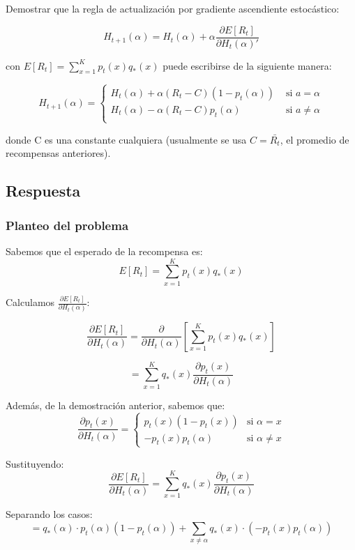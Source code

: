 \documentclass[12pt,a4paper]{article}
\begin{document}
Demostrar que la regla de actualización por gradiente ascendiente
estocástico:

$$ H_{t+1}(\alpha) = H_t(\alpha) + \alpha \frac{\partial E[R_t]}{\partial H_t(\alpha)'}$$

con $E[R_t] = \sum_{x=1}^{K} p_t(x)q_*(x)$ puede escribirse de la siguiente manera:

$$ H_{t+1}(\alpha) = 
\begin{cases} 
    H_t(\alpha) + \alpha (R_t - C)(1 - p_t(\alpha)) & \text{ si } a = \alpha \\
    H_t(\alpha) - \alpha (R_t - C)p_t(\alpha) & \text{ si } a \neq \alpha \\
\end{cases} $$

donde C es una constante cualquiera (usualmente se usa $C = \bar{R_t}$,
el promedio de recompensas anteriores).

\subsection{Respuesta}

\subsubsection{Planteo del problema}

Sabemos que el esperado de la recompensa es:
$$E[R_t] = \sum_{x=1}^{K} p_t(x)q_*(x)$$

Calculamos $\frac{\partial E[R_t]}{\partial H_t(\alpha)}$:

$$\frac{\partial E[R_t]}{\partial H_t(\alpha)} = \frac{\partial}{\partial H_t(\alpha)}\left[\sum_{x=1}^{K} p_t(x)q_*(x)\right]$$

$$= \sum_{x=1}^{K} q_*(x) \frac{\partial p_t(x)}{\partial H_t(\alpha)}$$

Además, de la demostración anterior, sabemos que:
$$\frac{\partial p_t(x)}{\partial H_t(\alpha)} = \begin{cases}
p_t(x)(1 - p_t(x)) & \text{si } \alpha = x \\
-p_t(x)p_t(\alpha) & \text{si } \alpha \neq x
\end{cases}$$

Sustituyendo:
$$\frac{\partial E[R_t]}{\partial H_t(\alpha)} = \sum_{x=1}^{K} q_*(x) \frac{\partial p_t(x)}{\partial H_t(\alpha)}$$

Separando los casos:
$$= q_*(\alpha) \cdot p_t(\alpha)(1 - p_t(\alpha)) + \sum_{x \neq \alpha} q_*(x) \cdot (-p_t(x)p_t(\alpha))$$
\end{document}
